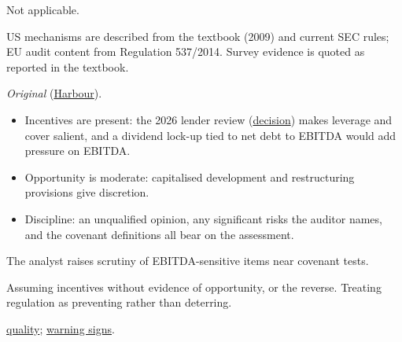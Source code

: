 \begin{qfdefinition}
 Not applicable.

 US mechanisms are described from the textbook (2009) and current SEC rules; EU audit content from Regulation 537/2014. Survey evidence is quoted as reported in the textbook.

 \emph{Original} (\hyperref[ex:harbour-tools-statements]{Harbour}).
\begin{itemize}
\item Incentives are present: the 2026 lender review (\hyperref[ex:integrated-credit-decision]{decision}) makes leverage and cover salient, and a dividend lock-up tied to net debt to EBITDA would add pressure on EBITDA.
\item Opportunity is moderate: capitalised development and restructuring provisions give discretion.
\item Discipline: an unqualified opinion, any significant risks the auditor names, and the covenant definitions all bear on the assessment.
\end{itemize}
The analyst raises scrutiny of EBITDA-sensitive items near covenant tests.

 Assuming incentives without evidence of opportunity, or the reverse. Treating regulation as preventing rather than deterring.

 \hyperref[def:reporting-results-quality]{quality}; \hyperref[meth:reporting-warning-signs]{warning signs}.

\end{qfdefinition}

